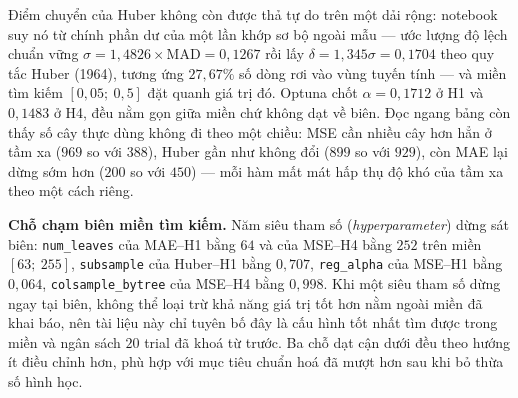\begin{table}[htbp]
\centering
\caption{Bộ siêu tham số tối ưu do Optuna lựa chọn theo từng cấu hình.}
\label{tab:sieu_tham_so}
\scriptsize
{}
\end{table}

Điểm chuyển của Huber không còn được thả tự do trên một dải rộng: notebook suy nó từ chính
phần dư của một lần khớp sơ bộ ngoài mẫu --- ước lượng độ lệch chuẩn vững
$\sigma = 1{,}4826 \times \mathrm{MAD} = 0{,}1267$ rồi lấy $\delta = 1{,}345\sigma = 0{,}1704$
theo quy tắc Huber (1964), tương ứng $27{,}67\%$ số dòng rơi vào vùng tuyến tính --- và miền
tìm kiếm $[0{,}05;\ 0{,}5]$ đặt quanh giá trị đó. Optuna chốt $\alpha = 0{,}1712$ ở H1 và
$0{,}1483$ ở H4, đều nằm gọn giữa miền chứ không dạt về biên. Đọc ngang bảng còn thấy số cây
thực dùng không đi theo một chiều: MSE cần nhiều cây hơn hẳn ở tầm xa ($969$ so với $388$),
Huber gần như không đổi ($899$ so với $929$), còn MAE lại dừng sớm hơn ($200$ so với $450$) ---
mỗi hàm mất mát hấp thụ độ khó của tầm xa theo một cách riêng.

\textbf{Chỗ chạm biên miền tìm kiếm.} Năm siêu tham số (\textit{hyperparameter}) dừng sát
biên: \texttt{num\_leaves} của MAE--H1 bằng $64$ và của MSE--H4 bằng $252$ trên miền
$[63;\ 255]$, \texttt{subsample} của Huber--H1 bằng $0{,}707$, \texttt{reg\_alpha} của MSE--H1
bằng $0{,}064$, \texttt{colsample\_bytree} của MSE--H4 bằng $0{,}998$. Khi một siêu tham số
dừng ngay tại biên, không thể loại trừ khả năng giá trị tốt hơn nằm ngoài miền đã khai báo,
nên tài liệu này chỉ tuyên bố đây là cấu hình tốt nhất tìm được trong miền và ngân sách $20$
trial đã khoá từ trước. Ba chỗ dạt cận dưới đều theo hướng ít điều chỉnh hơn, phù hợp với mục
tiêu chuẩn hoá đã mượt hơn sau khi bỏ thừa số hình học.

